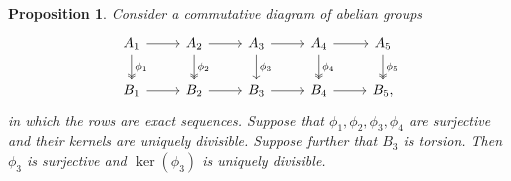 \documentclass[10pt,a4paper]{amsart}
\newtheorem{proposition}{Proposition}
\begin{document}
\begin{proposition}\label{pr:5lemmaDiv}
  Consider a commutative diagram of abelian groups
  \begin{equation}\label{eq:5lemma}
    \begin{tikzcd}
      A_1 \arrow[d,two heads,"\phi_1"] \rar & A_2 \arrow[d,two heads,"\phi_2"] \rar & A_3 \arrow[d,"\phi_3"] \rar & A_4 \arrow[d,two heads,"\phi_4"] \rar & A_5 \arrow[d,two heads,"\phi_5"] \\
      B_1 \rar & B_2 \rar & B_3 \rar & B_4 \rar & B_5,
    \end{tikzcd}
  \end{equation}
  in which the rows are exact sequences.
  Suppose that $\phi_1, \phi_2, \phi_3, \phi_4$ are surjective and their kernels are uniquely divisible. Suppose further that $B_3$ is torsion. Then $\phi_3$ is surjective and $\ker(\phi_3)$ is uniquely divisible.
\end{proposition}
\end{document}
